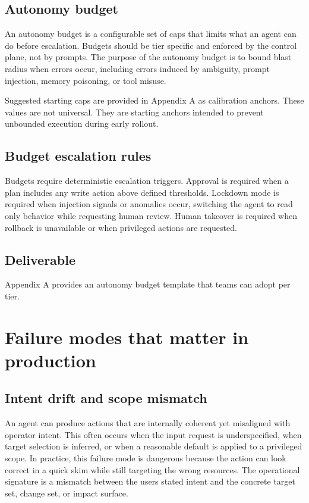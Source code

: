 \documentclass[11pt]{article}
\begin{document}
\subsection{Autonomy budget}
An autonomy budget is a configurable set of caps that limits what an agent can do before escalation. Budgets should be tier specific and enforced by the control plane, not by prompts. The purpose of the autonomy budget is to bound blast radius when errors occur, including errors induced by ambiguity, prompt injection, memory poisoning, or tool misuse.

Suggested starting caps are provided in Appendix A as calibration anchors. These values are not universal. They are starting anchors intended to prevent unbounded execution during early rollout.

\subsection{Budget escalation rules}
Budgets require deterministic escalation triggers. Approval is required when a plan includes any write action above defined thresholds. Lockdown mode is required when injection signals or anomalies occur, switching the agent to read only behavior while requesting human review. Human takeover is required when rollback is unavailable or when privileged actions are requested.

\subsection{Deliverable}
Appendix A provides an autonomy budget template that teams can adopt per tier.

\section{Failure modes that matter in production}

\subsection{Intent drift and scope mismatch}
An agent can produce actions that are internally coherent yet misaligned with operator intent. This often occurs when the input request is underspecified, when target selection is inferred, or when a reasonable default is applied to a privileged scope. In practice, this failure mode is dangerous because the action can look correct in a quick skim while still targeting the wrong resources. The operational signature is a mismatch between the user\textquotesingle s stated intent and the concrete target set, change set, or impact surface.
\end{document}
